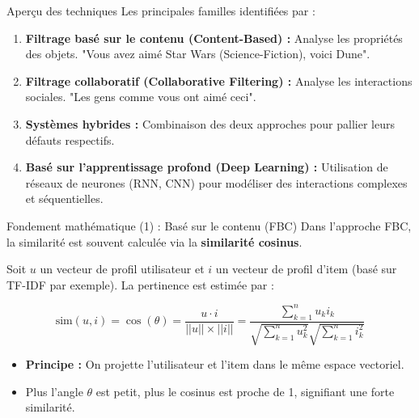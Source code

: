 \documentclass[9pt, aspectratio=169]{beamer}
\begin{document}
\begin{frame}{Aperçu des techniques}
    Les principales familles identifiées par \textcite{Ko2020A} :
    \begin{enumerate}
        \item \textbf{Filtrage basé sur le contenu (Content-Based) :} Analyse les propriétés des objets. "Vous avez aimé Star Wars (Science-Fiction), voici Dune".
        \item \textbf{Filtrage collaboratif (Collaborative Filtering) :} Analyse les interactions sociales. "Les gens comme vous ont aimé ceci".
        \item \textbf{Systèmes hybrides :} Combinaison des deux approches pour pallier leurs défauts respectifs.
        \item \textbf{Basé sur l'apprentissage profond (Deep Learning) :} Utilisation de réseaux de neurones (RNN, CNN) pour modéliser des interactions complexes et séquentielles.
    \end{enumerate}
\end{frame}

\begin{frame}{Fondement mathématique (1) : Basé sur le contenu (FBC)}
    Dans l'approche FBC, la similarité est souvent calculée via la \textbf{similarité cosinus}.
    
    Soit \(u\) un vecteur de profil utilisateur et \(i\) un vecteur de profil d'item (basé sur TF-IDF par exemple). La pertinence est estimée par :
    
    \begin{equation}
        \text{sim}(u, i) = \cos(\theta) = \frac{u \cdot i}{||u|| \times ||i||} = \frac{\sum_{k=1}^{n} u_k i_k}{\sqrt{\sum_{k=1}^{n} u_k^2} \sqrt{\sum_{k=1}^{n} i_k^2}}
    \end{equation}
    
    \begin{itemize}
        \item \textbf{Principe :} On projette l'utilisateur et l'item dans le même espace vectoriel.
        \item Plus l'angle \(\theta\) est petit, plus le cosinus est proche de 1, signifiant une forte similarité.
    \end{itemize}
\end{frame}
\end{document}
